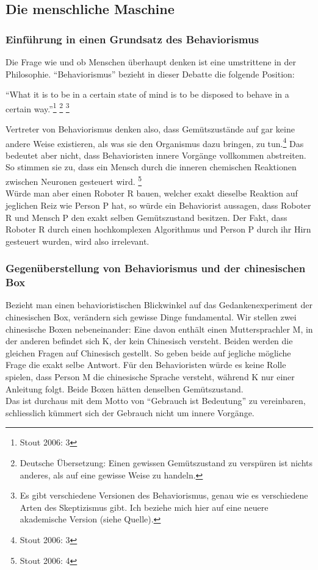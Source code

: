\documentclass[10pt,a4paper]{article}
\begin{document}
\subsection{Die menschliche Maschine}
\subsubsection{Einführung in einen Grundsatz des Behaviorismus}
Die Frage wie und ob Menschen überhaupt denken ist eine umstrittene in der Philosophie. \enquote{Behaviorismus} bezieht in dieser Debatte die folgende Position:
\begin{displayquote}
\enquote{What it is to be in a certain state of mind is to be disposed to behave in
a certain way.}\footnote{Stout 2006: 3} \footnote{Deutsche Übersetzung: Einen gewissen Gemütszustand zu verspüren ist nichts anderes, als auf eine gewisse Weise zu handeln.} \footnote{Es gibt verschiedene Versionen des Behaviorismus, genau wie es verschiedene Arten des Skeptizismus gibt. Ich beziehe mich hier auf eine neuere akademische Version (siehe Quelle).}
\end{displayquote}
Vertreter von Behaviorismus denken also, dass Gemütszustände auf gar keine andere Weise existieren, als was sie den Organismus dazu bringen, zu tun.\footnote{Stout 2006: 3} Das bedeutet aber nicht, dass Behavioristen innere Vorgänge vollkommen abstreiten. So stimmen sie zu, dass ein Mensch durch die inneren chemischen Reaktionen zwischen Neuronen gesteuert wird. \footnote{Stout 2006: 4}\\
Würde man aber einen Roboter R bauen, welcher exakt dieselbe Reaktion auf jeglichen Reiz wie Person P hat, so würde ein Behaviorist aussagen, dass Roboter R und Mensch P den exakt selben Gemütszustand besitzen. Der Fakt, dass Roboter R durch einen hochkomplexen Algorithmus und Person P durch ihr Hirn gesteuert wurden, wird also irrelevant.

\subsubsection{Gegenüberstellung von Behaviorismus und der chinesischen Box}
Bezieht man einen behavioristischen Blickwinkel auf das Gedankenexperiment der chinesischen Box, verändern sich gewisse Dinge fundamental. Wir stellen zwei chinesische Boxen nebeneinander: Eine davon enthält einen Muttersprachler M, in der anderen befindet sich K, der kein Chinesisch versteht. Beiden werden die gleichen Fragen auf Chinesisch gestellt. So geben beide auf jegliche mögliche Frage die exakt selbe Antwort. Für den Behavioristen würde es keine Rolle spielen, dass Person M die chinesische Sprache versteht, während K nur einer Anleitung folgt. Beide Boxen hätten denselben Gemütszustand. \\
Das ist durchaus mit dem Motto von \enquote{Gebrauch ist Bedeutung} zu vereinbaren, schliesslich kümmert sich der Gebrauch nicht um innere Vorgänge.
\end{document}
